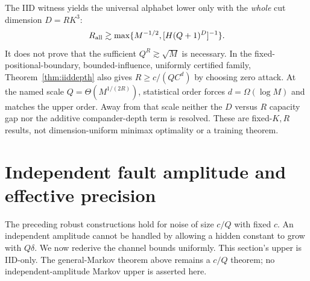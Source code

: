 \documentclass[11pt,letterpaper]{article}
\theoremstyle{definition}\newtheorem{definition}[theorem]{Definition}
\theoremstyle{remark}\newtheorem{remark}[theorem]{Remark}
\begin{document}
The IID witness yields the universal alphabet lower only with the \emph{whole} cut dimension $D=RK^3$:
\[
 R_{\rm all}\gtrsim\max\{M^{-1/2},[H(Q+1)^D]^{-1}\}.
\]
It does not prove that the sufficient $Q^R\gtrsim\sqrt M$ is necessary. In the fixed-positional-boundary, bounded-influence, uniformly certified family, Theorem~\ref{thm:iiddepth} also gives $R\ge c/(QC^d)$ by choosing zero attack. At the named scale $Q=\Theta(M^{1/(2R)})$, statistical order forces $d=\Omega(\log M)$ and matches the upper order. Away from that scale neither the $D$ versus $R$ capacity gap nor the additive compander-depth term is resolved. These are fixed-$K,R$ results, not dimension-uniform minimax optimality or a training theorem.

\section{Independent fault amplitude and effective precision}\label{sec:effectiveprecision}
The preceding robust constructions hold for noise of size $c/Q$ with fixed $c$. An independent amplitude cannot be handled by allowing a hidden constant to grow with $Q\delta$. We now rederive the channel bounds uniformly. This section's upper is IID-only. The general-Markov theorem above remains a $c/Q$ theorem; no independent-amplitude Markov upper is asserted here.
\end{document}
